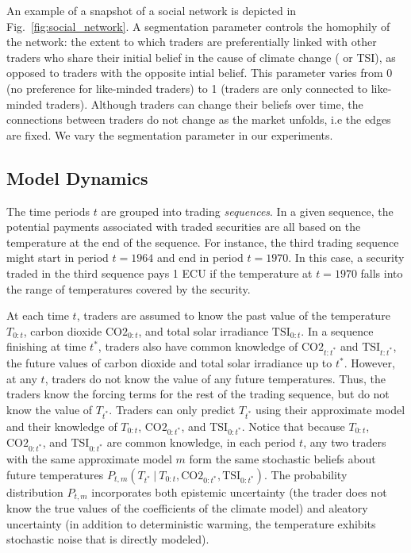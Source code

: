 \documentclass{wscpaperproc}\usepackage[]{graphicx}\usepackage[]{color}
\begin{document}
An example of a snapshot of a social network is depicted in Fig.~\ref{fig:social_network}.
A segmentation parameter controls the homophily of the network: the extent to which traders are preferentially linked with other traders who share their initial belief in the cause of climate change ( or TSI), as opposed to traders with the opposite intial belief. This parameter varies from 0 (no preference for like-minded traders) to 1 (traders are only connected to like-minded traders).
Although traders can change their beliefs over time, the connections between traders do not change as the market unfolds, i.e the edges are fixed.
We vary the segmentation parameter in our experiments.

\subsection{Model Dynamics}

The time periods $t$ are grouped into trading \emph{sequences\/}.
In a given sequence, the potential payments associated with traded securities are all based on the temperature at the end of the sequence.
For instance, the third trading sequence might start in period $t = 1964$ and end in period $t = 1970$.
In this case, a security traded in the third sequence pays 1 ECU if the temperature at $t = 1970$ falls into the range of temperatures covered by the security.

At each time $t$, traders are assumed to know the past value of the temperature ${T}_{0:t}$, carbon dioxide $\text{CO2}_{0:t}$, and total solar irradiance $\text{TSI}_{0:t}$.
In a sequence finishing at time $t^*$, traders also have common knowledge of $\text{CO2}_{t:t^*}$ and $\text{TSI}_{t:t^*}$, the future values of carbon dioxide and total solar irradiance up to $t^*$.
However, at any $t$, traders do not know the value of any future temperatures.
Thus, the traders know the forcing terms for the rest of the trading sequence, but do not know the value of ${T}_{t^*}$.
Traders can only predict ${T}_{t^*}$ using their approximate model and their knowledge of ${T}_{0:t}$, $\text{CO2}_{0:t^*}$, and $\text{TSI}_{0:t^*}$.
Notice that because ${T}_{0:t}$, $\text{CO2}_{0:t^*}$, and $\text{TSI}_{0:t^*}$ are common knowledge, in each period $t$, any two traders with the same approximate model $m$ form the same stochastic beliefs about future temperatures $P_{t,m}({T}_{t^*} ~|~ {T}_{0:t}, \text{CO2}_{0:t^*}, \text{TSI}_{0:t^*})$.
The probability distribution $P_{t,m}$ incorporates both epistemic uncertainty (the trader does not know the true values of the coefficients of the climate model) and aleatory uncertainty (in addition to deterministic warming, the temperature exhibits stochastic noise that is directly modeled).
\end{document}
